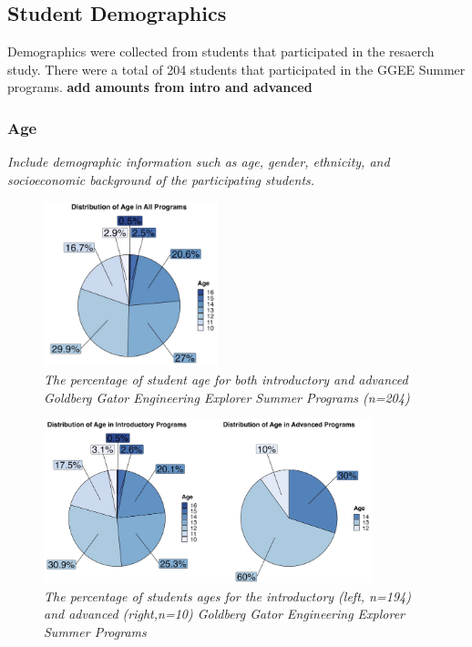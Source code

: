 \documentclass[
]{article}
\begin{document}
\hypertarget{student-demographics}{%
\subsection{Student Demographics}\label{student-demographics}}

Demographics were collected from students that participated in the
resaerch study. There were a total of 204 students that participated in
the GGEE Summer programs. \textbf{add amounts from intro and advanced}

\hypertarget{age}{%
\subsubsection{Age}\label{age}}

\emph{Include demographic information such as age, gender, ethnicity,
and socioeconomic background of the participating students.}

\begin{figure}
\centering
\includegraphics[width=0.45\textwidth,height=\textheight]{Graphs/Report/GGEE_23_Age_All.jpg}
\caption{\emph{The percentage of student age for both introductory and
advanced Goldberg Gator Engineering Explorer Summer Programs (n=204)}}
\end{figure}

\begin{figure}
\centering
\includegraphics[width=0.85\textwidth,height=\textheight]{Graphs/Report/GGEE_23_Age_IA.jpg}
\caption{\emph{The percentage of students ages for the introductory
(left, n=194) and advanced (right,n=10) Goldberg Gator Engineering
Explorer Summer Programs}}
\end{figure}
\end{document}
